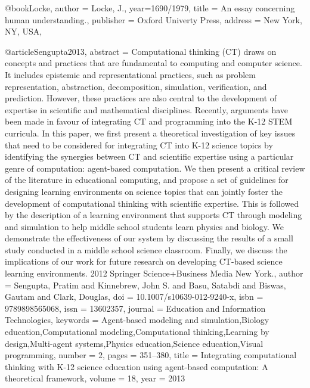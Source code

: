 

@book{Locke,
	author = {Locke, J.},
	year={1690/1979},
	title = {An essay concerning human understanding.},
	publisher = {Oxford Univerty Press},
	address = {New York, NY, USA},
}

@article{Sengupta2013,
abstract = {Computational thinking (CT) draws on concepts and practices that are fundamental to computing and computer science. It includes epistemic and representational practices, such as problem representation, abstraction, decomposition, simulation, verification, and prediction. However, these practices are also central to the development of expertise in scientific and mathematical disciplines. Recently, arguments have been made in favour of integrating CT and programming into the K-12 STEM curricula. In this paper, we first present a theoretical investigation of key issues that need to be considered for integrating CT into K-12 science topics by identifying the synergies between CT and scientific expertise using a particular genre of computation: agent-based computation. We then present a critical review of the literature in educational computing, and propose a set of guidelines for designing learning environments on science topics that can jointly foster the development of computational thinking with scientific expertise. This is followed by the description of a learning environment that supports CT through modeling and simulation to help middle school students learn physics and biology. We demonstrate the effectiveness of our system by discussing the results of a small study conducted in a middle school science classroom. Finally, we discuss the implications of our work for future research on developing CT-based science learning environments. {\textcopyright} 2012 Springer Science+Business Media New York.},
author = {Sengupta, Pratim and Kinnebrew, John S. and Basu, Satabdi and Biswas, Gautam and Clark, Douglas},
doi = {10.1007/s10639-012-9240-x},
isbn = {9789898565068},
issn = {13602357},
journal = {Education and Information Technologies},
keywords = {Agent-based modeling and simulation,Biology education,Computational modeling,Computational thinking,Learning by design,Multi-agent systems,Physics education,Science education,Visual programming},
number = {2},
pages = {351--380},
title = {{Integrating computational thinking with K-12 science education using agent-based computation: A theoretical framework}},
volume = {18},
year = {2013}
}


